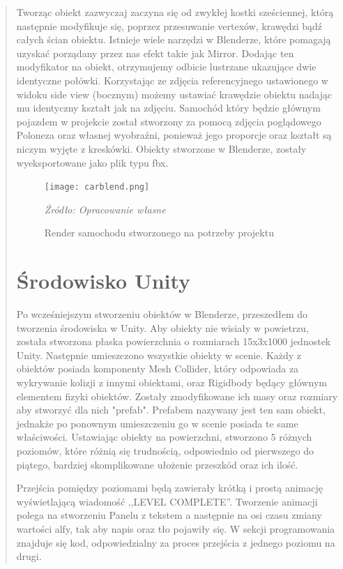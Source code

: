 \begin{quotation}
\indent Tworząc obiekt zazwyczaj zaczyna się od zwykłej kostki sześciennej, którą następnie modyfikuje się, poprzez przesuwanie vertexów, krawędzi bądź całych ścian obiektu. Istnieje wiele narzędzi w Blenderze, które pomagają uzyskać porządany przez nas efekt takie jak Mirror. Dodając ten modyfikator na obiekt, otrzymujemy odbicie lustrzane ukazujące dwie identyczne połówki. Korzystając ze zdjęcia referencyjnego ustawionego w widoku side view (bocznym) możemy ustawiać krawędzie obiektu nadając mu identyczny kształt jak na zdjęciu. Samochód który będzie głównym pojazdem w projekcie został stworzony za pomocą zdjęcia poglądowego Poloneza oraz własnej wyobraźni, ponieważ jego proporcje oraz kształt są niczym wyjęte z kreskówki. Obiekty stworzone w Blenderze, zostały wyeksportowane jako plik typu fbx.

\begin{figure}[!hbt]
\centering
  \texttt{[image: carblend.png]}
  \caption{Render samochodu stworzonego na potrzeby projektu}\label{rys_2}
  \begin{minipage}[t]{0.75\linewidth}
    \emph{Źródło: Opracowanie własne}
  \end{minipage}
\end{figure}

\newpage
\section{Środowisko Unity}
\indent Po wcześniejszym stworzeniu obiektów w Blenderze, przeszedłem do tworzenia środowiska w Unity. Aby obiekty nie wisiały w powietrzu, została stworzona płaska powierzchnia o rozmiarach 15x3x1000 jednostek Unity. Następnie umieszczono wszystkie obiekty w scenie. Każdy z obiektów posiada komponenty Mesh Collider, który odpowiada za wykrywanie kolizji z innymi obiektami, oraz Rigidbody będący głównym elementem fizyki obiektów.  Zostały zmodyfikowane ich masy oraz rozmiary aby stworzyć dla nich "prefab". Prefabem nazywany jest ten sam obiekt, jednakże po ponownym umieszczeniu go w scenie posiada te same właściwości. Ustawiając obiekty na powierzchni, stworzono 5 różnych poziomów, które różnią się trudnością, odpowiednio od pierwszego do piątego, bardziej skomplikowane ułożenie przeszkód oraz ich ilość. 

\indent Przejścia pomiędzy poziomami będą zawierały krótką i prostą animację wyświetlającą wiadomość ,,LEVEL COMPLETE''. Tworzenie animacji polega na stworzeniu Panelu z tekstem a następnie na osi czasu zmiany wartości alfy, tak aby napis oraz tło pojawiły się. W sekcji programowania znajduje się kod, odpowiedzialny za proces przejścia z jednego poziomu na drugi. 


\end{quotation}
